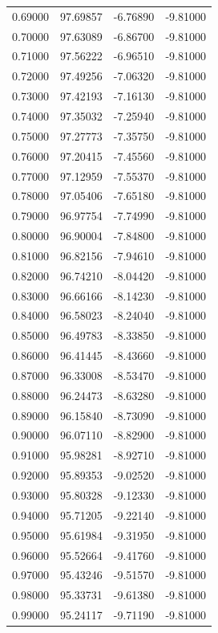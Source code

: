 \begin{table}
\begin{tabular}{llll}
0.69000 & 97.69857 & -6.76890 & -9.81000 \\
0.70000 & 97.63089 & -6.86700 & -9.81000 \\
0.71000 & 97.56222 & -6.96510 & -9.81000 \\
0.72000 & 97.49256 & -7.06320 & -9.81000 \\
0.73000 & 97.42193 & -7.16130 & -9.81000 \\
0.74000 & 97.35032 & -7.25940 & -9.81000 \\
0.75000 & 97.27773 & -7.35750 & -9.81000 \\
0.76000 & 97.20415 & -7.45560 & -9.81000 \\
0.77000 & 97.12959 & -7.55370 & -9.81000 \\
0.78000 & 97.05406 & -7.65180 & -9.81000 \\
0.79000 & 96.97754 & -7.74990 & -9.81000 \\
0.80000 & 96.90004 & -7.84800 & -9.81000 \\
0.81000 & 96.82156 & -7.94610 & -9.81000 \\
0.82000 & 96.74210 & -8.04420 & -9.81000 \\
0.83000 & 96.66166 & -8.14230 & -9.81000 \\
0.84000 & 96.58023 & -8.24040 & -9.81000 \\
0.85000 & 96.49783 & -8.33850 & -9.81000 \\
0.86000 & 96.41445 & -8.43660 & -9.81000 \\
0.87000 & 96.33008 & -8.53470 & -9.81000 \\
0.88000 & 96.24473 & -8.63280 & -9.81000 \\
0.89000 & 96.15840 & -8.73090 & -9.81000 \\
0.90000 & 96.07110 & -8.82900 & -9.81000 \\
0.91000 & 95.98281 & -8.92710 & -9.81000 \\
0.92000 & 95.89353 & -9.02520 & -9.81000 \\
0.93000 & 95.80328 & -9.12330 & -9.81000 \\
0.94000 & 95.71205 & -9.22140 & -9.81000 \\
0.95000 & 95.61984 & -9.31950 & -9.81000 \\
0.96000 & 95.52664 & -9.41760 & -9.81000 \\
0.97000 & 95.43246 & -9.51570 & -9.81000 \\
0.98000 & 95.33731 & -9.61380 & -9.81000 \\
0.99000 & 95.24117 & -9.71190 & -9.81000 \\

\end{tabular}
\end{table}
